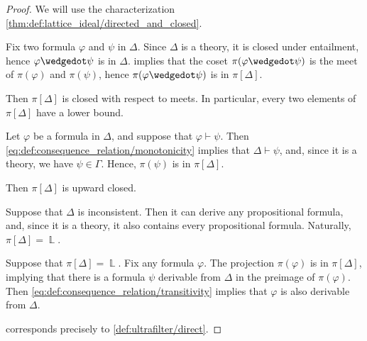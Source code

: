 \begin{proof}
   We will use the characterization \cref{thm:def:lattice_ideal/directed_and_closed}.

   Fix two formula \( \varphi \) and \( \psi \) in \( \Delta \). Since \( \Delta \) is a theory, it is closed under entailment, hence \( \varphi \synwedge \psi \) is in \( \Delta \).  implies that the coset \( \pi(\varphi \synwedge \psi) \) is the meet of \( \pi(\varphi) \) and \( \pi(\psi) \), hence \( \pi(\varphi \synwedge \psi) \) is in \( \pi[\Delta] \).

  Then \( \pi[\Delta] \) is closed with respect to meets. In particular, every two elements of \( \pi[\Delta] \) have a lower bound.

   Let \( \varphi \) be a formula in \( \Delta \), and suppose that \( \varphi \vdash \psi \). Then \eqref{eq:def:consequence_relation/monotonicity} implies that \( \Delta \vdash \psi \), and, since it is a theory, we have \( \psi \in \Gamma \). Hence, \( \pi(\psi) \) is in \( \pi[\Delta] \).

  Then \( \pi[\Delta] \) is upward closed.


  \SufficiencySubProof* Suppose that \( \Delta \) is inconsistent. Then it can derive any propositional formula, and, since it is a theory, it also contains every propositional formula. Naturally, \( \pi[\Delta] = \BbbL \).

  \NecessitySubProof* Suppose that \( \pi[\Delta] = \BbbL \). Fix any formula \( \varphi \). The projection \( \pi(\varphi) \) is in \( \pi[\Delta] \), implying that there is a formula \( \psi \) derivable from \( \Delta \) in the preimage of \( \pi(\varphi) \). Then \eqref{eq:def:consequence_relation/transitivity} implies that \( \varphi \) is also derivable from \( \Delta \).

    corresponds precisely to \cref{def:ultrafilter/direct}.
\end{proof}

